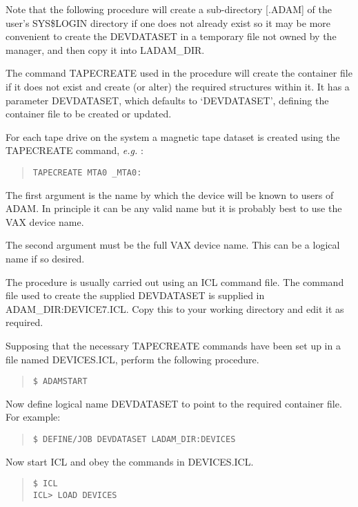 Note that the following procedure will create a sub-directory [.ADAM] of the
user's SYS\$LOGIN directory if one does not already exist so it may be more
convenient to create the DEVDATASET in a temporary file not owned by the
manager, and then copy it into LADAM\_DIR.

The command TAPECREATE used in the procedure will create the
container file if it does not exist and create (or alter) the required
structures within it.
It has a parameter DEVDATASET, which defaults to `DEVDATASET', defining
the container file to be created or updated.

For each tape drive on the system a magnetic tape dataset is created
using the TAPECREATE command, {\em e.g.} :
\small \begin{quote}
\begin{verbatim}
TAPECREATE MTA0 _MTA0:
\end{verbatim}
\end{quote} \normalsize
The first argument is the name by which the device will be known to users of
ADAM. In principle it can be any valid name but it is probably best to use
the VAX device name.

The second argument must be the full VAX device name. This can be a logical
name if so desired.

The procedure is usually carried out using an ICL command file.
The command file used to create the supplied DEVDATASET is
supplied in ADAM\-\_DIR:\-DEV\-ICE7.ICL.
Copy this to your working directory and edit it as required.

Supposing that the necessary TAPECREATE commands have been set up
in a file named DEVICES.ICL, perform the following procedure.
\small \begin{quote}
\begin{verbatim}
$ ADAMSTART
\end{verbatim}
\end{quote} \normalsize
Now define logical name DEVDATASET to point to the required container file.
For example:
\small \begin{quote}
\begin{verbatim}
$ DEFINE/JOB DEVDATASET LADAM_DIR:DEVICES
\end{verbatim}
\end{quote} \normalsize
Now start ICL and obey the commands in DEVICES.ICL.
\small \begin{quote}
\begin{verbatim}
$ ICL
ICL> LOAD DEVICES
\end{verbatim}
\end{quote} \normalsize

